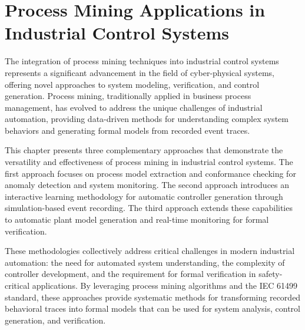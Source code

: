 \section{Process Mining Applications in Industrial Control Systems}

The integration of process mining techniques into industrial control systems represents a significant advancement in the field of cyber-physical systems, offering novel approaches to system modeling, verification, and control generation. Process mining, traditionally applied in business process management, has evolved to address the unique challenges of industrial automation, providing data-driven methods for understanding complex system behaviors and generating formal models from recorded event traces.

This chapter presents three complementary approaches that demonstrate the versatility and effectiveness of process mining in industrial control systems. The first approach focuses on process model extraction and conformance checking for anomaly detection and system monitoring. The second approach introduces an interactive learning methodology for automatic controller generation through simulation-based event recording. The third approach extends these capabilities to automatic plant model generation and real-time monitoring for formal verification.

These methodologies collectively address critical challenges in modern industrial automation: the need for automated system understanding, the complexity of controller development, and the requirement for formal verification in safety-critical applications. By leveraging process mining algorithms and the IEC 61499 standard, these approaches provide systematic methods for transforming recorded behavioral traces into formal models that can be used for system analysis, control generation, and verification.

